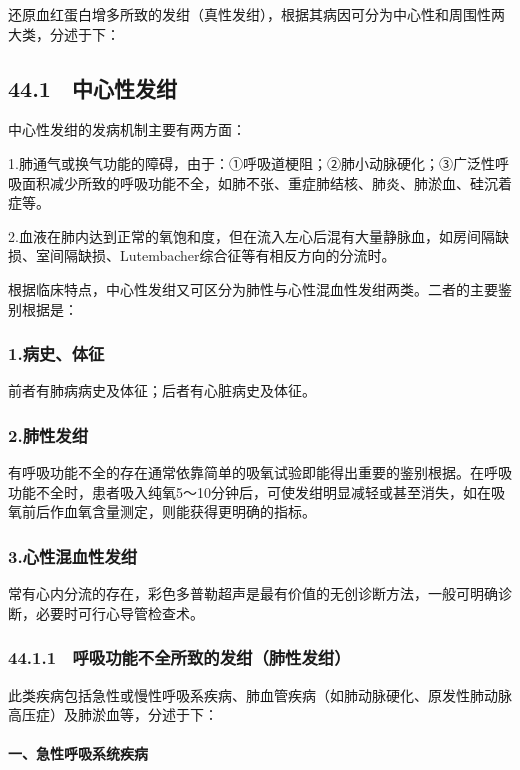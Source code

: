 还原血红蛋白增多所致的发绀（真性发绀），根据其病因可分为中心性和周围性两大类，分述于下：

\subsection{44.1　中心性发绀}

中心性发绀的发病机制主要有两方面：

1.肺通气或换气功能的障碍，由于：①呼吸道梗阻；②肺小动脉硬化；③广泛性呼吸面积减少所致的呼吸功能不全，如肺不张、重症肺结核、肺炎、肺淤血、硅沉着症等。

2.血液在肺内达到正常的氧饱和度，但在流入左心后混有大量静脉血，如房间隔缺损、室间隔缺损、Lutembacher综合征等有相反方向的分流时。

根据临床特点，中心性发绀又可区分为肺性与心性混血性发绀两类。二者的主要鉴别根据是：

\subsubsection{1.病史、体征}

前者有肺病病史及体征；后者有心脏病史及体征。

\subsubsection{2.肺性发绀}

有呼吸功能不全的存在通常依靠简单的吸氧试验即能得出重要的鉴别根据。在呼吸功能不全时，患者吸入纯氧5～10分钟后，可使发绀明显减轻或甚至消失，如在吸氧前后作血氧含量测定，则能获得更明确的指标。

\subsubsection{3.心性混血性发绀}

常有心内分流的存在，彩色多普勒超声是最有价值的无创诊断方法，一般可明确诊断，必要时可行心导管检查术。

\subsubsection{44.1.1　呼吸功能不全所致的发绀（肺性发绀）}

此类疾病包括急性或慢性呼吸系疾病、肺血管疾病（如肺动脉硬化、原发性肺动脉高压症）及肺淤血等，分述于下：

\paragraph{一、急性呼吸系统疾病}

